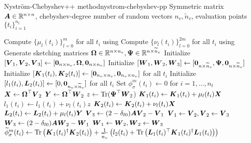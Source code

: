 \begin{algo}{Nystr\"om-Chebyshev++ method}{nystrom-chebyshev-pp}
    Symmetric matrix $\boldsymbol{A} \in \mathbb{R}^{n \times n}$, 
    \gls{chebyshev-degree}
    number of random vectors $n_v, \widetilde{n}_v$,
    evaluation points $\{t_i\}_{i=1}^{n_t}$
    \begin{algorithmic}[1]
        \State Compute $\{\mu_l(t_i)\}_{l=0}^m$ for all $t_i$ using 
        \State Compute $\{\nu_l(t_i)\}_{l=0}^{2m}$ for all $t_i$ using 
        \State Generate sketching matrices $\boldsymbol{\boldsymbol{\Omega}} \in \mathbb{R}^{n \times n_v}, \boldsymbol{\Psi} \in \mathbb{R}^{n \times \widetilde{n}_v}$ %
        \State Initialize $[\boldsymbol{V}_1, \boldsymbol{V}_2, \boldsymbol{V}_3] \gets [\boldsymbol{0}_{n \times n_v}, \boldsymbol{\boldsymbol{\Omega}}, \boldsymbol{0}_{n \times n_v}]$
        \State Initialize $[\boldsymbol{W}_1, \boldsymbol{W}_2, \boldsymbol{W}_3] \gets [\boldsymbol{0}_{n \times \widetilde{n}_v}, \boldsymbol{\Psi}, \boldsymbol{0}_{n \times \widetilde{n}_v}]$
        \State Initialize $[\boldsymbol{K}_1(t_i), \boldsymbol{K}_2(t_i)] \gets [\boldsymbol{0}_{n_v \times n_v}, \boldsymbol{0}_{n_v \times n_v}]$ for all $t_i$
        \State Initialize $[l_1(t_i), \boldsymbol{L}_2(t_i)] \gets [0, \boldsymbol{0}_{n_v \times \widetilde{n}_v}]$ for all $t_i$
        \State Set ${\phi}_{\sigma}^m(t_i) \gets 0$ for $i=1,\dots,n_t$
          \State $\boldsymbol{X} \gets \boldsymbol{\boldsymbol{\Omega}}^{\top} \boldsymbol{V}_2$
          \State $\boldsymbol{Y} \gets \boldsymbol{\boldsymbol{\Omega}}^{\top} \boldsymbol{W}_2$
          \State $z \gets \operatorname{Tr}(\boldsymbol{\Psi}^{\top} \boldsymbol{W}_2$)
                \State $\boldsymbol{K}_1(t_i) \gets \boldsymbol{K}_1(t_i) + \mu_l(t_i) \boldsymbol{X}$
                \State $l_1(t_i) \gets l_1(t_i) + \nu_l(t_i) z$
            \EndIf
            \State $\boldsymbol{K}_2(t_i) \gets \boldsymbol{K}_2(t_i) + \nu_l(t_i) \boldsymbol{X}$
            \State $\boldsymbol{L}_2(t_i) \gets \boldsymbol{L}_2(t_i) + \mu_l(t_i) \boldsymbol{Y}$
          \EndFor
          \State $\boldsymbol{V}_3 \gets (2 - \delta_{l0}) \boldsymbol{A} \boldsymbol{V}_2 - \boldsymbol{V}_1$ 
          \State $\boldsymbol{V}_1 \gets \boldsymbol{V}_2, \boldsymbol{V}_2 \gets \boldsymbol{V}_3$
          \State $\boldsymbol{W}_3 \gets (2 - \delta_{l0}) \boldsymbol{A} \boldsymbol{W}_2 - \boldsymbol{W}_1$ 
          \State $\boldsymbol{W}_1 \gets \boldsymbol{W}_2, \boldsymbol{W}_2 \gets \boldsymbol{W}_3$
        \EndFor
          \State $\widetilde{\phi}_{\sigma}^m(t_i) \gets \operatorname{Tr}\left( \boldsymbol{K}_1(t_i)^{\dagger}\boldsymbol{K}_2(t_i) \right) + \frac{1}{\widetilde{n}_v} \left( l_2(t_i) + \operatorname{Tr}\left( \boldsymbol{L}_1(t_i)^{\top} \boldsymbol{K}_1(t_i)^{\dagger} \boldsymbol{L}_1(t_i) \right)  \right) $
        \EndFor
    \end{algorithmic}
\end{algo}

